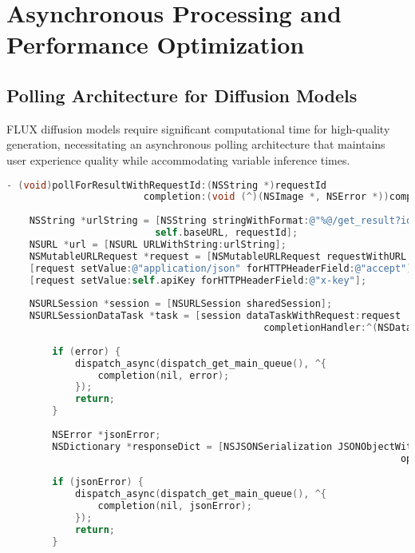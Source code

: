 \section{Asynchronous Processing and Performance Optimization}

\subsection{Polling Architecture for Diffusion Models}

FLUX diffusion models require significant computational time for high-quality generation, necessitating an asynchronous polling architecture that maintains user experience quality while accommodating variable inference times.

\begin{lstlisting}[language=C,basicstyle=\footnotesize\ttfamily,frame=single,breaklines=true,columns=flexible,caption={Asynchronous Polling Implementation},label={lst:polling_implementation}]
- (void)pollForResultWithRequestId:(NSString *)requestId
                        completion:(void (^)(NSImage *, NSError *))completion {
    
    NSString *urlString = [NSString stringWithFormat:@"%@/get_result?id=%@", 
                          self.baseURL, requestId];
    NSURL *url = [NSURL URLWithString:urlString];
    NSMutableURLRequest *request = [NSMutableURLRequest requestWithURL:url];
    [request setValue:@"application/json" forHTTPHeaderField:@"accept"];
    [request setValue:self.apiKey forHTTPHeaderField:@"x-key"];
    
    NSURLSession *session = [NSURLSession sharedSession];
    NSURLSessionDataTask *task = [session dataTaskWithRequest:request 
                                             completionHandler:^(NSData *data, NSURLResponse *response, NSError *error) {
        
        if (error) {
            dispatch_async(dispatch_get_main_queue(), ^{
                completion(nil, error);
            });
            return;
        }
        
        NSError *jsonError;
        NSDictionary *responseDict = [NSJSONSerialization JSONObjectWithData:data 
                                                                     options:0 
                                                                       error:&jsonError];
        if (jsonError) {
            dispatch_async(dispatch_get_main_queue(), ^{
                completion(nil, jsonError);
            });
            return;
        }
        

\end{lstlisting}
